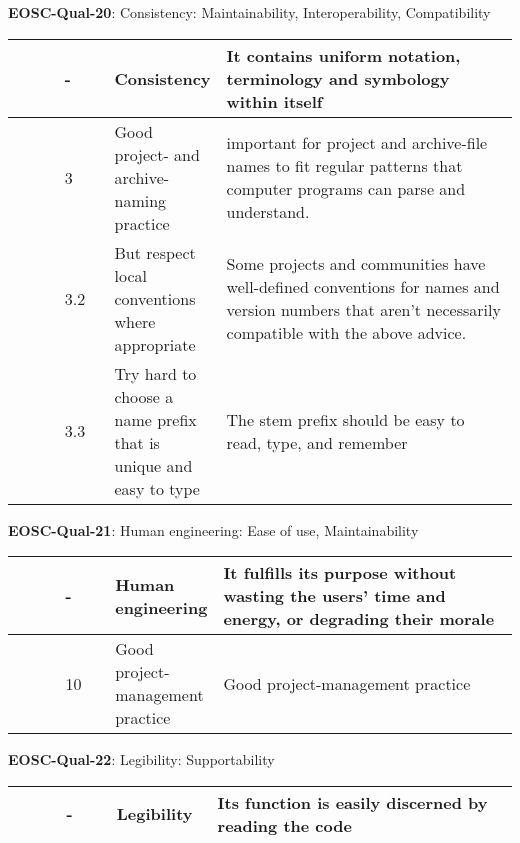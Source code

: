 \textbf{EOSC-Qual-20}: Consistency: Maintainability, Interoperability, Compatibility
\nopagebreak[4]
\begin{center}
    \tabletail{\hline}
    \tiny
    \begin{supertabular}{|p{0.10\linewidth}|p{0.10\linewidth}|p{0.20\linewidth}|p{0.60\linewidth}|} \hline
        \cite{boehm_quantitative_1976} & - & Consistency & It contains uniform notation, terminology and symbology within itself\\ \hline
        \cite{raymond_software_2013} & 3 & Good project- and archive- naming practice & important for project and archive-file names to fit regular patterns that computer programs can parse and understand.\\ \hline
        \cite{raymond_software_2013} & 3.2 & But respect local conventions where appropriate & Some projects and communities have well-defined conventions for names and version numbers that aren't necessarily compatible with the above advice.\\ \hline
        \cite{raymond_software_2013} & 3.3 & Try hard to choose a name prefix that is unique and easy to type & The stem prefix should be easy to read, type, and remember\\ \hline
    \end{supertabular}
\end{center}

\textbf{EOSC-Qual-21}: Human engineering: Ease of use, Maintainability
\nopagebreak[4]
\begin{center}
    \tabletail{\hline}
    \tiny
    \begin{supertabular}{|p{0.10\linewidth}|p{0.10\linewidth}|p{0.20\linewidth}|p{0.60\linewidth}|} \hline
        \cite{boehm_quantitative_1976} & - & Human engineering & It fulfills its purpose without wasting the users' time and energy, or degrading their morale\\ \hline
        \cite{raymond_software_2013} & 10 & Good project-management practice & Good project-management practice\\ \hline
    \end{supertabular}
\end{center}

\textbf{EOSC-Qual-22}: Legibility: Supportability
\nopagebreak[4]
\begin{center}
    \tabletail{\hline}
    \tiny
    \begin{supertabular}{|p{0.10\linewidth}|p{0.10\linewidth}|p{0.20\linewidth}|p{0.60\linewidth}|} \hline
        \cite{boehm_quantitative_1976} & - & Legibility & Its function is easily discerned by reading the code\\ \hline
    \end{supertabular}
\end{center}

